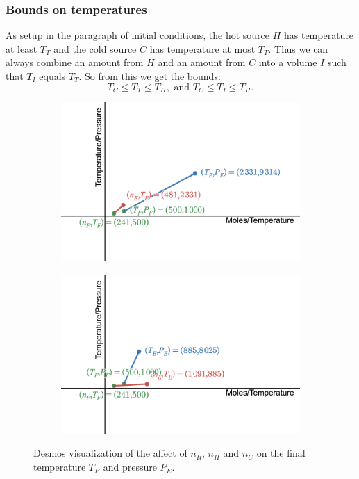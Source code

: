 \documentclass{article}
\begin{document}
\subsubsection*{Bounds on temperatures}

As setup in the paragraph of initial conditions, the hot source $H$ has temperature at least $T_T$
and the cold source $C$ has temperature at most $T_T$.
Thus we can always combine an amount from
$H$ and an amount from $C$ into a volume $I$ such that $T_I$ equals $T_T$.
So from this we get the bounds:
\[
    T_C\le T_T\le T_H,\text{ and }T_C\le T_I\le T_H.
\]
\begin{figure}
    \begin{center}
        \begin{subfigure}{0.49\linewidth}
            \includegraphics[width=.95\linewidth]{./images/desmos-example-1-1.png}
        \end{subfigure}
        \begin{subfigure}{0.49\linewidth}
            \includegraphics[width=.95\linewidth]{./images/desmos-example-1-2.png}
        \end{subfigure}
    \end{center}
    \caption{Desmos visualization of the affect of $n_R$, $n_H$ and $n_C$
    on the final temperature $T_E$ and pressure $P_E$.}
    \label{fig:desmos-1}
\end{figure}
\end{document}
